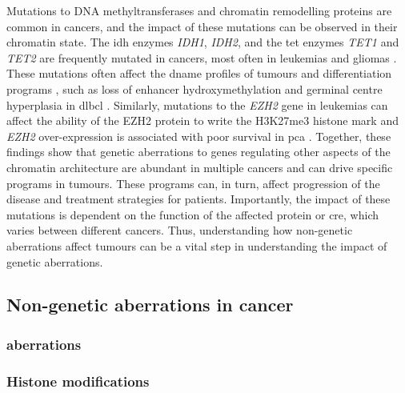 Mutations to DNA methyltransferases and chromatin remodelling proteins are common in cancers, and the impact of these mutations can be observed in their chromatin state.
The \gls{idh} enzymes \emph{IDH1}, \emph{IDH2}, and the \gls{tet}  enzymes \emph{TET1} and \emph{TET2} are frequently mutated in cancers, most often in leukemias and gliomas \cite{pirozziImplicationsIDHMutations2021,imDNMT3AIDHMutations2014,issaAcuteMyeloidLeukemia2021,molenaarWildtypeMutatedIDH12018,shihRoleMutationsEpigenetic2012}.
These mutations often affect the \gls{dname} profiles of tumours and differentiation programs \cite{pirozziImplicationsIDHMutations2021}, such as loss of enhancer hydroxymethylation and germinal centre hyperplasia in \gls{dlbcl} \cite{dominguezTET2DeficiencyCauses2018}.
Similarly, mutations to the \emph{EZH2} gene in leukemias can affect the ability of the EZH2 protein to write the H3K27me3 histone mark \cite{plassMutationsRegulatorsEpigenome2013,nikoloskiSomaticMutationsHistone2010,ernstInactivatingMutationsHistone2010,morinSomaticMutationsAltering2010} and \emph{EZH2} over-expression is associated with poor survival in \gls{pca} \cite{varamballyPolycombGroupProtein2002,xuEZH2OncogenicActivity2012,minOncogeneTumorSuppressor2010,kimTargetingEZH2Cancer2016}.
Together, these findings show that genetic aberrations to genes regulating other aspects of the chromatin architecture are abundant in multiple cancers and can drive specific programs in tumours.
These programs can, in turn, affect progression of the disease and treatment strategies for patients.
Importantly, the impact of these mutations is dependent on the function of the affected protein or \gls{cre}, which varies between different cancers.
Thus, understanding how non-genetic aberrations affect tumours can be a vital step in understanding the impact of genetic aberrations.

\subsection{Non-genetic aberrations in cancer}

\subsubsection{ aberrations}

\subsubsection{Histone modifications}

